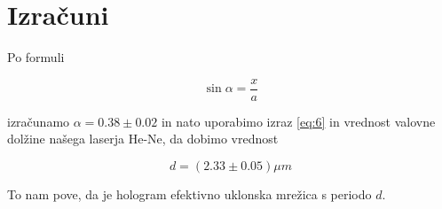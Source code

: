 \documentclass[11pt]{article}
\renewcommand{%
  \refname}{Viri}
\begin{document}
\section{Izračuni}\label{sec:org51bb9fd}

Po formuli

\begin{equation}
\label{eq:7}
\sin \alpha = \frac{x}{a}
\end{equation}

izračunamo \(\alpha = 0.38 \pm 0.02\) in nato uporabimo izraz \ref{eq:6} in vrednost valovne dolžine našega laserja He-Ne, da dobimo vrednost

\[
d = (2.33 \pm 0.05) \mu m
\]

To nam pove, da je hologram efektivno uklonska mrežica s periodo \(  d \).
\end{document}
